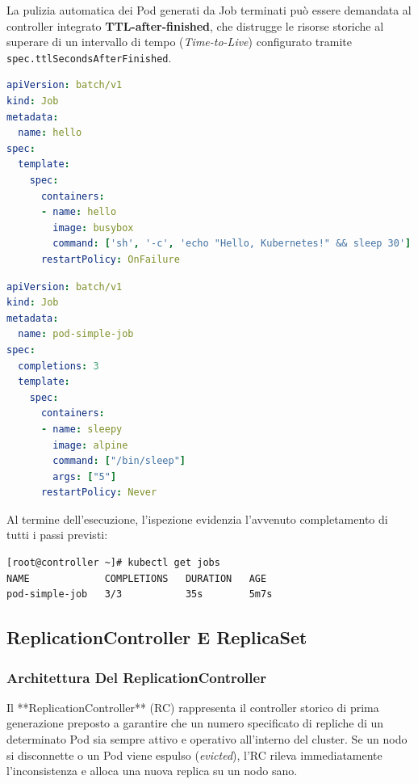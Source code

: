 \documentclass[11pt, a4paper]{article}
\begin{document}
La pulizia automatica dei Pod generati da Job terminati può essere demandata al controller integrato \textbf{TTL-after-finished}, che distrugge le risorse storiche al superare di un intervallo di tempo (\emph{Time-to-Live}) configurato tramite \texttt{spec.ttlSecondsAfterFinished}.

\begin{lstlisting}[language=yaml, caption={Esempio di manifest per un Job semplice con policy OnFailure (\texttt{job1.yml}).}]
apiVersion: batch/v1
kind: Job
metadata:
  name: hello
spec:
  template:
    spec:
      containers:
      - name: hello
        image: busybox
        command: ['sh', '-c', 'echo "Hello, Kubernetes!" && sleep 30']
      restartPolicy: OnFailure
\end{lstlisting}

\begin{lstlisting}[language=yaml, caption={Job sequenziale con tre completamenti successivi (\texttt{pod-simple-job.yml}).}]
apiVersion: batch/v1
kind: Job
metadata:
  name: pod-simple-job
spec:
  completions: 3
  template:
    spec:
      containers:
      - name: sleepy
        image: alpine
        command: ["/bin/sleep"]
        args: ["5"]
      restartPolicy: Never
\end{lstlisting}

Al termine dell'esecuzione, l'ispezione evidenzia l'avvenuto completamento di tutti i passi previsti:
\begin{lstlisting}[language=bash]
[root@controller ~]# kubectl get jobs
NAME             COMPLETIONS   DURATION   AGE
pod-simple-job   3/3           35s        5m7s
\end{lstlisting}

\subsection{ReplicationController E ReplicaSet}

\subsubsection{Architettura Del ReplicationController}
Il **ReplicationController** (RC) rappresenta il controller storico di prima generazione preposto a garantire che un numero specificato di repliche di un determinato Pod sia sempre attivo e operativo all'interno del cluster. Se un nodo si disconnette o un Pod viene espulso (\emph{evicted}), l'RC rileva immediatamente l'inconsistenza e alloca una nuova replica su un nodo sano.
\end{document}

